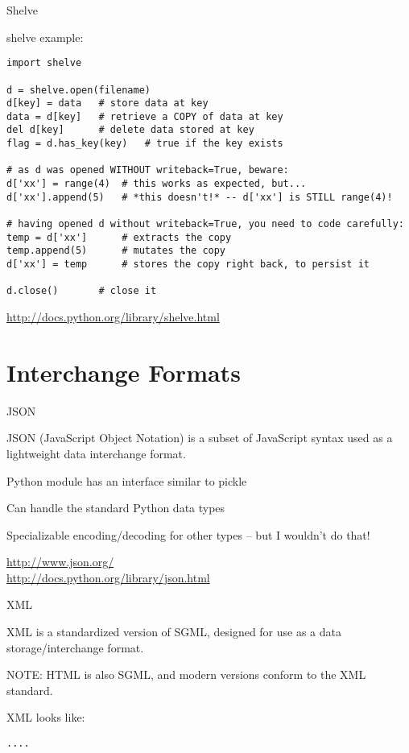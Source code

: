 \documentclass{beamer}
\begin{document}
\begin{frame}[fragile]{Shelve}

\vfill
{\Large shelve example:}

\begin{verbatim}
import shelve

d = shelve.open(filename) 
d[key] = data   # store data at key 
data = d[key]   # retrieve a COPY of data at key 
del d[key]      # delete data stored at key 
flag = d.has_key(key)   # true if the key exists

# as d was opened WITHOUT writeback=True, beware:
d['xx'] = range(4)  # this works as expected, but...
d['xx'].append(5)   # *this doesn't!* -- d['xx'] is STILL range(4)!

# having opened d without writeback=True, you need to code carefully:
temp = d['xx']      # extracts the copy
temp.append(5)      # mutates the copy
d['xx'] = temp      # stores the copy right back, to persist it

d.close()       # close it
\end{verbatim}

\vfill
\url{http://docs.python.org/library/shelve.html}
\end{frame} 


\section{Interchange Formats} 

\begin{frame}[fragile]{JSON}

\vfill
{\Large JSON (JavaScript Object Notation) is a subset of JavaScript syntax
        used as a lightweight data interchange format.}

\vfill
{\Large Python module has an interface similar to pickle}

\vfill
{\Large Can handle the standard Python data types}

\vfill
{\Large Specializable encoding/decoding for other types -- but I wouldn't do that!}


\vfill
\url{http://www.json.org/}\\
\url{http://docs.python.org/library/json.html}
\end{frame} 

\begin{frame}[fragile]{XML}

\vfill
{\Large XML is a standardized version of SGML, designed for use as a data
        storage/interchange format.}

\vfill
{\Large NOTE: HTML is also SGML, and modern versions conform to the XML standard.}

\vfill
{\Large XML looks like:}

\begin{verbatim} 
....
\end{verbatim} 

\end{frame} 
\end{document}
